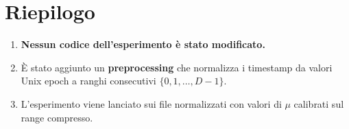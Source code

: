 \documentclass[a4paper,11pt]{article}
\begin{document}
\section{Riepilogo}

\begin{enumerate}
  \item \textbf{Nessun codice dell'esperimento \`e stato modificato.}
  \item \`E stato aggiunto un \textbf{preprocessing} che normalizza i timestamp da valori Unix epoch a ranghi consecutivi $\{0, 1, \ldots, D-1\}$.
  \item L'esperimento viene lanciato sui file normalizzati con valori di $\mu$ calibrati sul range compresso.
\end{enumerate}
\end{document}
